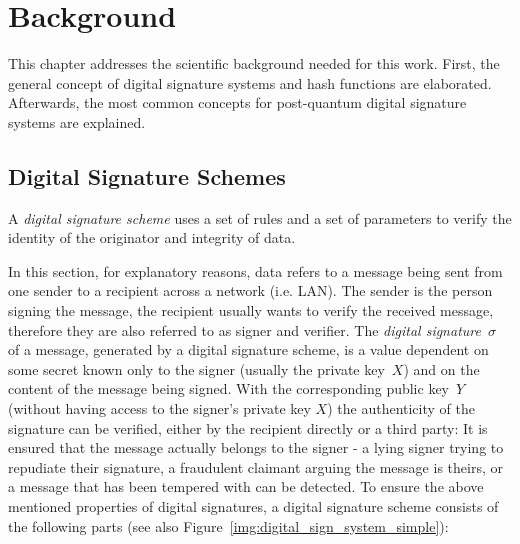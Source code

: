 \chapter{Background}
\label{cha:background}
This chapter addresses the scientific background needed for this work. First, the general concept of digital signature systems and hash functions are elaborated. Afterwards, the most common concepts for post-quantum digital signature systems are explained. 

\section{Digital Signature Schemes}
A \textit{digital signature scheme} uses a set of rules and a set of parameters to verify the identity of the originator and integrity of data.~\cite{cha:bg_digital_sign_schemes_NIST_standard1992} 

In this section, for explanatory reasons, data refers to a message being sent from one sender to a recipient across a network (i.e. LAN). The sender is the person signing the message, the recipient usually wants to verify the received message, therefore they are also referred to as signer and verifier. %
The \textit{digital signature~$\sigma$} of a message, generated by a digital signature scheme, is a value dependent on some secret known only to the signer (usually the private key~$X$) and on the content of the message being signed. With the corresponding public key~$Y$ (without having access to the signer's private key $X$) the authenticity of the signature can be verified, either by the recipient directly or a third party: It is ensured that the message actually belongs to the signer - a lying signer trying to repudiate their signature, a fraudulent claimant arguing the message is theirs, or a message that has been tempered with can be detected.
To ensure the above mentioned properties of digital signatures, a digital signature scheme consists of the following parts (see also Figure~\ref{img:digital_sign_system_simple}):~\cite{cha:bg_signature_schemes_book_menezes2018_1997} %

